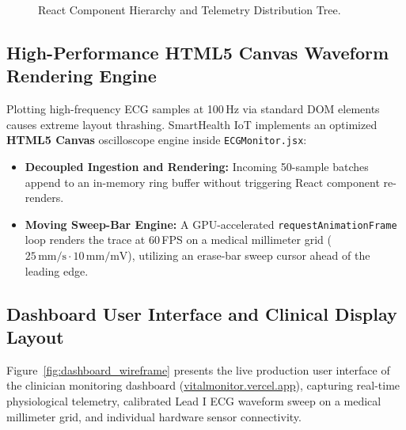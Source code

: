 \documentclass[12pt]{article}
\begin{document}
\begin{figure}[htbp]
\begin{tcolorbox}[tikzbox, title={React Component Hierarchy and Telemetry Distribution Tree}, width=\linewidth]
{%
}
\end{tcolorbox}
\vspace{-0.2cm}
\caption{React Component Hierarchy and Telemetry Distribution Tree.}
\label{fig:component_tree}
\end{figure}

\subsection{High-Performance HTML5 Canvas Waveform Rendering Engine}
Plotting high-frequency ECG samples at 100\,Hz via standard DOM elements causes extreme layout thrashing. SmartHealth IoT implements an optimized \textbf{HTML5 Canvas} oscilloscope engine inside \texttt{ECGMonitor.jsx}:
\begin{itemize}[itemsep=2pt, parsep=0pt, topsep=1.5pt]
    \item \textbf{Decoupled Ingestion and Rendering:} Incoming 50-sample batches append to an in-memory ring buffer without triggering React component re-renders.
    \item \textbf{Moving Sweep-Bar Engine:} A GPU-accelerated \texttt{requestAnimationFrame} loop renders the trace at 60\,FPS on a medical millimeter grid ($25\,\text{mm/s} \cdot 10\,\text{mm/mV}$), utilizing an erase-bar sweep cursor ahead of the leading edge.
\end{itemize}
\clearpage

\subsection{Dashboard User Interface and Clinical Display Layout}
Figure~\ref{fig:dashboard_wireframe} presents the live production user interface of the clinician monitoring dashboard (\href{https://vitalmonitor.vercel.app}{vitalmonitor.vercel.app}), capturing real-time physiological telemetry, calibrated Lead I ECG waveform sweep on a medical millimeter grid, and individual hardware sensor connectivity.
\end{document}
